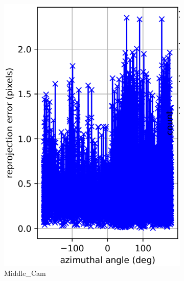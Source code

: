 \documentclass{article}
\begin{document}
\begin{figure}
\begin{subfigure}[b]{0.3\textwidth}
         \includegraphics[width=\textwidth]{cam1az.png}
         \caption{Middle\_Cam}
     \end{subfigure}
     \hfill
     \begin{subfigure}[b]{0.3\textwidth}
         \centering

\end{subfigure}
\end{figure}
\end{document}
